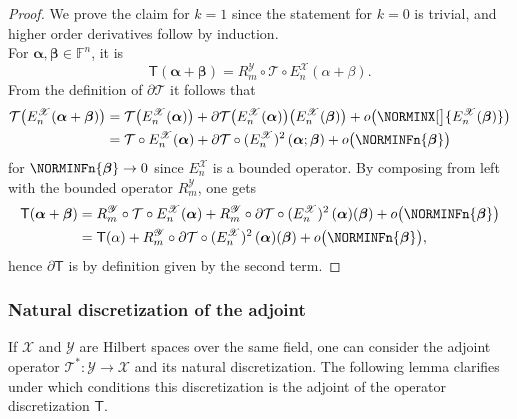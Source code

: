 \documentclass[a4paper]{paper}
\newcommand*{\SPC}[1]{{\ensuremath{\mathscr{#1}}}}
\newcommand*{\SPCX}{\SPC{X}}
\newcommand*{\SPCY}{\SPC{Y}}
\newcommand{\FIELD}{{\ensuremath{\mathbb{F}}}}
\newcommand*{\Fn}{{\ensuremath{\FIELD^n}}}
\newcommand*{\OP}[1]{{\ensuremath{\mathcal{#1}}}}
\newcommand*{\OPT}{\OP{T}}
\newcommand{\DISCOP}[1]{{\ensuremath{\mathsf{#1}}}}
\newcommand*{\DISCOPT}{\DISCOP{T}}
\newcommand*{\EXT}[2]{\ensuremath{E_{#1}^{#2}}}
\newcommand*{\REST}[2]{\ensuremath{R_{#1}^{#2}}}
\newcommand*{\RmY}{{\ensuremath{\REST{m}{\SPC{Y}}}}}
\newcommand*{\EnX}{{\ensuremath{\EXT{n}{\SPC{X}}}}}
\newcommand{\valpha}{\boldsymbol{\alpha}}
\newcommand{\vbeta}{\boldsymbol{\beta}}
\begin{document}
\begin{proof}
 We prove the claim for $k=1$ since the statement for $k=0$ is trivial, and higher order derivatives follow by 
 induction.\\
 For $\valpha,\vbeta \in \Fn$, it is
 \begin{equation*}
  \DISCOPT(\valpha + \vbeta) = \RmY \circ \OPT \circ \EnX (\alpha + \beta).
 \end{equation*}
 From the definition of $\partial \OPT$ it follows that
 \begin{align*}
  \OPT\big(\EnX(\valpha + \vbeta)\big)
  &= \OPT\big(\EnX(\valpha)\big) + \partial\OPT\big(\EnX(\valpha)\big)\big(\EnX(\vbeta)\big) +
  o\big(\NORMINX[\big]{\EnX(\vbeta)}\big) \\
  &= \OPT \circ \EnX(\valpha) + \partial\OPT\circ (\EnX)^2\,(\valpha; \vbeta) + o\big(\NORMINFn{\vbeta} \big)
 \end{align*}
 for $\NORMINFn{\vbeta} \to 0$ since $\EnX$ is a bounded operator. By composing from left with the bounded operator 
 $\RmY$, one gets
 \begin{align*}
  \DISCOPT(\valpha + \vbeta)
  &= \RmY \circ \OPT \circ \EnX(\valpha) + \RmY \circ \partial\OPT\circ (\EnX)^2\,(\valpha)(\vbeta) +
  o\big(\NORMINFn{\vbeta} \big) 
  \\
  &= \DISCOPT(\alpha) + \RmY \circ \partial\OPT\circ (\EnX)^2\,(\valpha)(\vbeta) + o\big(\NORMINFn{\vbeta} \big),
 \end{align*}
 hence $\partial\DISCOPT$ is by definition given by the second term.
\end{proof}


\subsubsection{Natural discretization of the adjoint}
\label{subsubsec:discr:operator:op_adj}

If $\SPCX$ and $\SPCY$ are Hilbert spaces over the same field, one can consider the adjoint operator 
$\OPT^* \colon \SPCY \to \SPCX$ and its natural discretization. The following lemma clarifies under which 
conditions this discretization is the adjoint of the operator discretization $\DISCOPT$.
\end{document}
